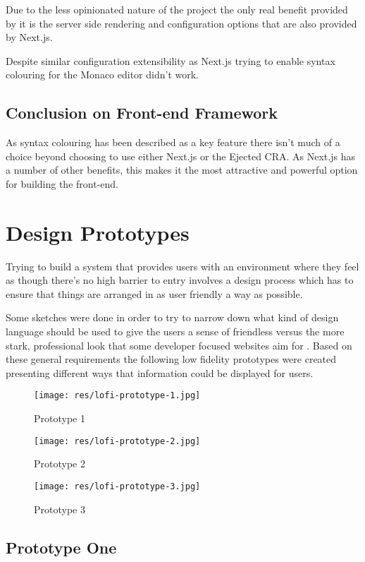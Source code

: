Due to the less opinionated nature of the project the only real benefit provided by it is the server side rendering and configuration options that are also provided by Next.js.

Despite similar configuration extensibility as Next.js trying to enable syntax colouring for the Monaco editor didn't work.

\subsection{Conclusion on Front-end Framework}

As syntax colouring has been described as a key feature there isn't much of a choice beyond choosing to use either Next.js or the Ejected CRA. As Next.js has a number of other benefits, this makes it the most attractive and powerful option for building the front-end.

\section{Design Prototypes} \label{solapp-design}

Trying to build a system that provides users with an environment where they feel as though there's no high barrier to entry involves a design process which has to ensure that things are arranged in as user friendly a way as possible.

Some sketches were done in order to try to narrow down what kind of design language should be used to give the users a sense of friendless versus the more stark, professional look that some developer focused websites aim for \cite{stackoverflow}. Based on these general requirements the following low fidelity prototypes were created presenting different ways that information could be displayed for users.

\begin{figure}[!htb]
  \texttt{[image: res/lofi-prototype-1.jpg]}
  \caption{Prototype 1}\label{fig:lofi-prototype-1}
  \endminipage\hfill
  \texttt{[image: res/lofi-prototype-2.jpg]}
  \caption{Prototype 2}\label{fig:lofi-prototype-2}
  \endminipage\hfill
  \texttt{[image: res/lofi-prototype-3.jpg]}
  \caption{Prototype 3}\label{fig:lofi-prototype-3}
  \endminipage
\end{figure}

\subsection{Prototype One}

